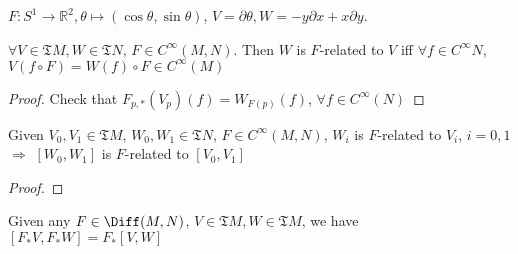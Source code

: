 \begin{example}
     $ F:S^1\rightarrow \mathbb{R}^2,\theta\mapsto (\cos \theta,\sin \theta) $,  $ V=\partial \theta,W=-y\partial x+x\partial y $. 
\end{example}
\begin{lemma}
     $ \forall V\in\mathfrak{T}M, W\in \mathfrak{T}N $,  $ F\in C^\infty (M,N) $. Then  $ W $ is  $ F $-related to  $ V $ iff  $ \forall  f\in C^\infty N $,  $ V(f\circ F)=W(f)\circ F\in C^\infty (M) $     
\end{lemma}
\begin{proof}
    Check that  $ F_{p,*}(V_p)(f)=W_{F(p)}(f) $,  $ \forall f\in C^\infty(N) $
\end{proof}
\begin{proposition}
    Given  $ V_0,V_1\in \mathfrak{T}M $,  $ W_0,W_1\in \mathfrak{T}N $,  $ F\in C^\infty(M,N) $,  $ W_i $ is  $ F $-related to  $ V_i $, $ i=0,1 $  $ \Rightarrow  $ $ [W_0,W_1] $  is  $ F $-related to  $ [V_0,V_1] $         
\end{proposition}
\begin{proof}
    
\end{proof}
\begin{corollary}
    Given any  $ F\in \Diff(M,N) $,  $ V\in \mathfrak{T}M, W\in \mathfrak{T}M  $, we have  $ [F_*V,F_*W]=F_*[V,W] $   
\end{corollary}